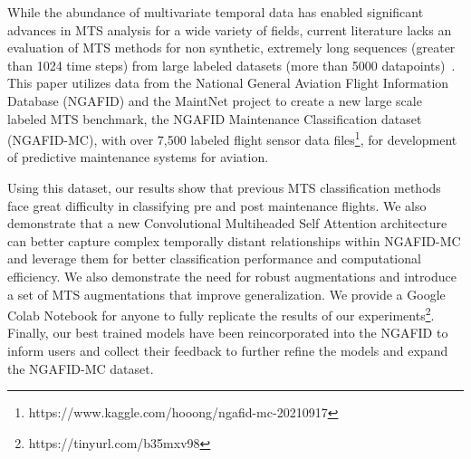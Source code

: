 \documentclass[letterpaper]{article} %
\newcommand{\eg}{{\textit{e.g.}}}
\begin{document}

While the abundance of multivariate temporal data has enabled significant advances in MTS analysis for a wide variety of fields, current literature lacks an evaluation of MTS methods for non synthetic, extremely long sequences (greater than 1024 time steps) from large labeled datasets (more than 5000 datapoints)~\cite{fawaz2019deep}. This paper utilizes data from the National General Aviation Flight Information Database (NGAFID) and the MaintNet project to create a new large scale labeled MTS benchmark, the NGAFID Maintenance Classification dataset (NGAFID-MC), with over 7,500 labeled flight sensor data files\footnote{https://www.kaggle.com/hooong/ngafid-mc-20210917}, for development of predictive maintenance systems for aviation.

Using this dataset, our results show that previous MTS classification methods face great difficulty in classifying pre and post maintenance flights. We also demonstrate that a new Convolutional Multiheaded Self Attention architecture can better capture complex temporally distant relationships within NGAFID-MC and leverage them for better classification performance and computational efficiency. We also demonstrate the need for robust augmentations and introduce a set of MTS augmentations that improve generalization. We provide a Google Colab Notebook for anyone to fully replicate the results of our experiments\footnote{https://tinyurl.com/b35mxv98}. Finally, our best trained models have been reincorporated into the NGAFID to inform users and collect their feedback to further refine the models and expand the NGAFID-MC dataset.
\end{document}
